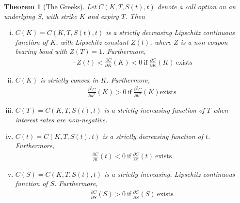 \documentclass[12pt]{article}
\newcommand{\p}{\partial}
\theoremstyle{plain}
\newtheorem{theorem}{Theorem}
\theoremstyle{definition}
\theoremstyle{remark}
\numberwithin{equation}{section}  %
\begin{document}
\begin{theorem}[The Greeks]
	Let $C(K, T, S(t), t)$ denote a call option on an underlying $S$, with 
	strike $K$ and expiry $T$. Then
	\begin{enumerate}[(i)]
		\item\label{itm:first} $C(K) = C(K, T, S(t), t)$ is a strictly decreasing Lipschitz continuous
			function of $K$, with Lipschitz constant $Z(t)$, where $Z$ is a non-coupon
			bearing bond with $Z(T) = 1$. Furthermore,
			\begin{equation*}
				\begin{split}
					-Z(t) < \frac{\p C}{\p K}(K) < 0 
					\ \text{if}\  \frac{\p C}{\p K}(K) \  \text{exists} 
				\end{split}
			\end{equation*}

		\item\label{itm:second} $C(K)$ is strictly convex in $K$. Furthermore,
			\begin{equation*}
				\begin{split}
					\frac{\p^{2} C}{\p
						k^{2}}(K) > 0 \ \text{if} \ \frac{\p^{2} C}{\p
						k^{2}}(K) \text{exists}
				\end{split}
			\end{equation*}
		\item\label{itm:third}
			$C(T) = C(K, T, S(t), t)$ is a strictly increasing function of
			$T$ when interest rates are non-negative.
		\item\label{itm:fourth}
			$C(t) = C(K, T, S(t), t)$ is a strictly decreasing function of
			$t$. Furthermore, 
			\begin{equation*}
				\begin{split}
					\frac{\p C}{\p t}(t) < 0 \ \text{if} 
					\  \frac{\p C}{\p t}(t) \ \text{exists}
				\end{split}
			\end{equation*}
		\item\label{itm:fifth}
			$C(S) = C(K, T, S(t), t)$ is a strictly increasing,
			Lipschitz continuous function of $S$. Furthermore,
			\begin{equation*}
				\begin{split}
					\frac{\p C}{\p S}(S) > 0 \ \text{if}
					\ \frac{\p C}{\p S}(S) \ \text{exists}
				\end{split}
			\end{equation*}
	\end{enumerate}
\end{theorem} 
\end{document}
